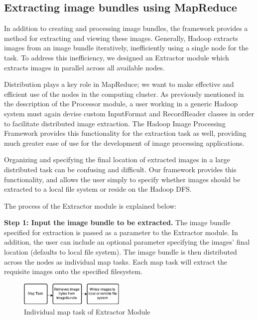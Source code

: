 \documentclass[conference]{IEEEtran}
\begin{document}
\subsection{Extracting image bundles using MapReduce}
In addition to creating and processing image bundles, the framework
provides a method for extracting and viewing these images.  Generally,
Hadoop extracts images from an image bundle iteratively, inefficiently
using a single node for the task. To address this inefficiency, we
designed an Extractor module which extracts images in parallel across
all available nodes.

Distribution plays a key role in MapReduce; we want to make effective
and efficient use of the nodes in the computing cluster.  As
previously mentioned in the description of the Processor module, a
user working in a generic Hadoop system must again devise custom
InputFormat and RecordReader classes in order to facilitate
distributed image extraction.  The Hadoop Image Processing Framework
provides this functionality for the extraction task as well, providing
much greater ease of use for the development of image processing
applications.

Organizing and specifying the final location of extracted images in a
large distributed task can be confusing and difficult.  Our framework
provides this functionality, and allows the user simply to specify
whether images should be extracted to a local file system or reside on
the Hadoop DFS.
 
The process of the Extractor module is explained below:

\textbf{Step 1: Input the image bundle to be extracted.} The image
bundle specified for extraction is passed as a parameter to the
Extractor module.  In addition, the user can include an optional
parameter specifying the images' final location (defaults to local
file system).  The image bundle is then distributed across the nodes
as individual map tasks. Each map task will extract the requisite
images onto the specified filesystem.

\begin{figure}[h]
  \centering
  \includegraphics[width=0.45\textwidth]{ext-map}
  \caption{Individual map task of Extractor Module}
  \label{fig:ext-map}
\end{figure}
\end{document}
